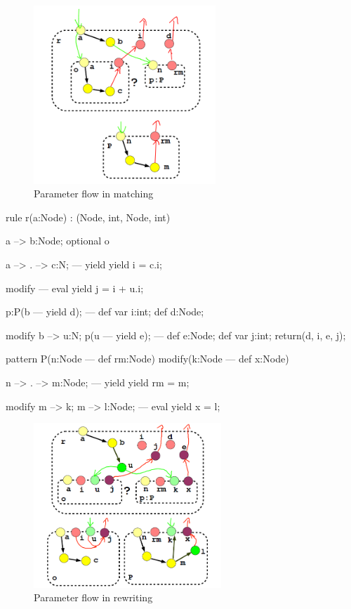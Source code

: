 \begin{figure}[hptb]
  \centering
  \includegraphics[width=0.61\textwidth]{fig/MatchAndParameterFlowAnnotated}
  \caption{Parameter flow in matching}
  \label{figmatchingparameterflow}
\end{figure}

\begin{example}
  \begin{grgen}
rule r(a:Node) : (Node, int, Node, int) {
  a --> b:Node;
  optional o {
    a --> . --> c:N;
	---
    yield {	yield i = c.i; }
		
    modify {
		---
      eval { yield j = i + u.i; }
    }
  }
  p:P(b --- yield d);
---	
  def var i:int;
  def d:Node;
	
  modify {
    b --> u:N;
    p(u --- yield e);
  ---
    def e:Node; def var j:int;
    return(d, i, e, j);
  }
}
pattern P(n:Node --- def rm:Node) modify(k:Node --- def x:Node) {
  n --> . --> m:Node;
---
  yield {	yield rm = m; }
	
  modify {
    m --> k; m --> l:Node;
  ---
    eval { yield x = l; }
  }
}
  \end{grgen}
\end{example}\label{exrewritingparameterflow}

\begin{figure}[hptb]
  \centering
  \includegraphics[width=0.63\textwidth]{fig/RewriteAndParameterFlowAnnotated}
  \caption{Parameter flow in rewriting}
  \label{figrewritingparameterflow}
\end{figure}

